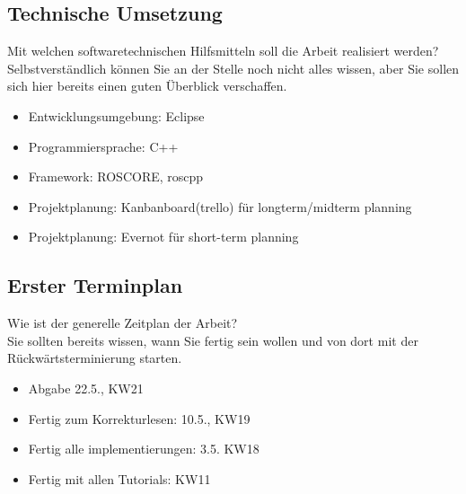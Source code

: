 \documentclass[pdftex,a4paper,12pt]{scrartcl}
\begin{document}
\subsection{Technische Umsetzung}
Mit welchen softwaretechnischen Hilfsmitteln soll die Arbeit realisiert werden? \\
Selbstverständlich können Sie an der Stelle noch nicht alles wissen, aber Sie sollen sich hier bereits einen guten Überblick verschaffen.
\begin{itemize}
	\item Entwicklungsumgebung: Eclipse
	\item Programmiersprache: C++
	\item Framework: ROSCORE, roscpp
	\item Projektplanung: Kanbanboard(trello) für longterm/midterm planning
	\item Projektplanung: Evernot für short-term planning
\end{itemize}

\subsection{Erster Terminplan}
 Wie ist der generelle Zeitplan der Arbeit? \\
 Sie sollten bereits wissen, wann Sie fertig sein wollen und von dort mit der Rückwärtsterminierung starten.\\
\begin{itemize}
	\item Abgabe 22.5., KW21
	\item Fertig zum Korrekturlesen: 10.5., KW19
	\item Fertig alle implementierungen: 3.5. KW18
	\item Fertig mit allen Tutorials: KW11
\end{itemize}
\end{document}
